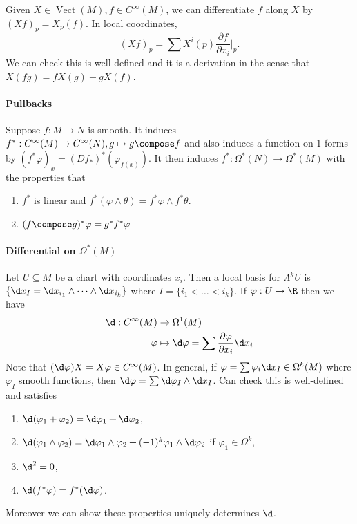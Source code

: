 \documentclass[a4paper]{article}
\newcommand{\w}{\wedge} %
\DeclareMathOperator{\Vect}{Vect} %
\begin{document}
Given \(X \in \Vect(M), f \in C^\infty(M)\), we can differentiate \(f\) along \(X\) by \((Xf)_p = X_p(f)\). In local coordinates,
\[
  (Xf)_p = \sum X^i(p) \frac{\partial f}{\partial x_i}|_p.
\]
We can check this is well-defined and it is a derivation in the sense that \(X(fg) = fX(g) + gX(f)\).

\paragraph{Pullbacks}

Suppose \(f: M \to N\) is smooth. It induces \(f^*: C^\infty(M) \to C^\infty(N), g \mapsto g \compose f\) and also induces a function on \(1\)-forms by \((f^*\varphi)_x = (Df_*)^* (\varphi_{f(x)})\). It then induces \(f^*: \Omega^*(N) \to \Omega^*(M)\) with the properties that
\begin{enumerate}
\item \(f^*\) is linear and \(f^*(\varphi \w \theta) = f^*\varphi \w f^* \theta\).
\item \((f \compose g)^* \varphi = g^*f^* \varphi\)
\end{enumerate}

\paragraph{Differential on \(\Omega^*(M)\)}

Let \(U \subseteq M\) be a chart with coordinates \(x_i\). Then a local basis for \(\Lambda^kU\) is \(\{\d x_I = \d x_{i_1} \w \cdots \w \d x_{i_k}\}\) where \(I = \{i_1 < \dots < i_k\}\). If \(\varphi: U \to \R\) then we have
\begin{align*}
  \d: C^\infty(M) &\to \Omega^1(M) \\
  \varphi &\mapsto \d \varphi = \sum \frac{\partial \varphi}{\partial x_i} \d x_i
\end{align*}
Note that \((\d \varphi)X = X\varphi \in C^\infty(M)\). In general, if \(\varphi = \sum \varphi_i \d x_I \in \Omega^k(M)\) where \(\varphi_I\) smooth functions, then \(\d \varphi = \sum \d \varphi_I \w \d x_I\). Can check this is well-defined and satisfies
\begin{enumerate}
\item \(\d (\varphi_1 + \varphi_2) = \d \varphi_1 + \d \varphi_2\),
\item \(\d (\varphi_1 \w \varphi_2) = \d \varphi_1 \w \varphi_2 + (-1)^k \varphi_1 \w \d \varphi_2\) if \(\varphi_1 \in \Omega^k\),
\item \(\d^2 = 0\),
\item \(\d (f^*\varphi) = f^*(\d \varphi)\).
\end{enumerate}
Moreover we can show these properties uniquely determines \(\d\).
\end{document}
